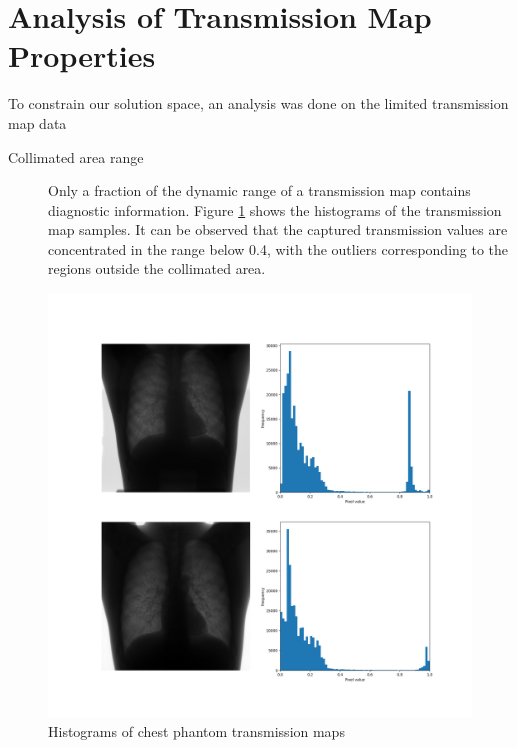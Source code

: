 \documentclass[nomenclature, english, bibtex]{kththesis}
\numberwithin{listing}{chapter}
\begin{document}
\section{Analysis of Transmission Map Properties}

To constrain our solution space, an analysis was done on the limited transmission map data

\begin{description}
    \item[Collimated area range] Only a fraction of the dynamic range of a transmission map
   contains diagnostic information. Figure \ref{fig:transmissionMapsHistograms} shows the histograms
   of the transmission map samples. It can be observed that the captured transmission values are concentrated in
  the range below 0.4, with the outliers corresponding to the regions outside the collimated area. 
  \item[]


\end{description}

\begin{figure}[H]
    \centering
    \includegraphics[width=1.0\textwidth]{figures/transmission_maps_histograms.png}
    \caption{Histograms of chest phantom transmission maps}
    \label{fig:transmissionMapsHistograms}
\end{figure}
\end{document}

